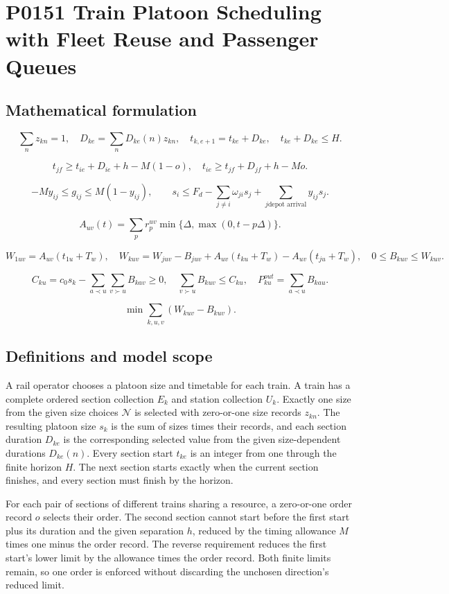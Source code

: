 \documentclass[10pt]{article}
\begin{document}
\section*{P0151 Train Platoon Scheduling with Fleet Reuse and Passenger Queues}
\subsection*{Mathematical formulation}
\[
\sum_nz_{kn}=1,\quad D_{ke}=\sum_nD_{ke}(n)z_{kn},\quad
t_{k,e+1}=t_{ke}+D_{ke},\quad t_{ke}+D_{ke}\le H.
\]

\[
t_{jf}\ge t_{ie}+D_{ie}+h-M(1-o),\quad
t_{ie}\ge t_{jf}+D_{jf}+h-Mo.
\]

\[
-My_{ij}\le g_{ij}\le M(1-y_{ij}),\qquad
s_i\le F_d-\sum_{j\ne i}\omega_{ji}s_j+\sum_{j\text{depot arrival}}y_{ij}s_j.
\]

\[
A_{uv}(t)=\sum_p r^{uv}_p\min\{\Delta,\max(0,t-p\Delta)\}.
\]

\[
W_{1uv}=A_{uv}(t_{1u}+T_w),\quad
W_{kuv}=W_{juv}-B_{juv}+A_{uv}(t_{ku}+T_w)-A_{uv}(t_{ju}+T_w),
\quad0\le B_{kuv}\le W_{kuv}.
\]

\[
C_{ku}=c_0s_k-\sum_{a\prec u}\sum_{v\succ u}B_{kav}\ge0,\quad
\sum_{v\succ u}B_{kuv}\le C_{ku},\quad
P^{out}_{ku}=\sum_{a\prec u}B_{kau}.
\]

\[
\min\sum_{k,u,v}(W_{kuv}-B_{kuv}).
\]

\subsection*{Definitions and model scope}
A rail operator chooses a platoon size and timetable for each train. A train has a complete ordered section collection $E_k$ and station collection $U_k$. Exactly one size from the given size choices $\mathcal N$ is selected with zero-or-one size records $z_{kn}$. The resulting platoon size $s_k$ is the sum of sizes times their records, and each section duration $D_{ke}$ is the corresponding selected value from the given size-dependent durations $D_{ke}(n)$. Every section start $t_{ke}$ is an integer from one through the finite horizon $H$. The next section starts exactly when the current section finishes, and every section must finish by the horizon.

For each pair of sections of different trains sharing a resource, a zero-or-one order record $o$ selects their order. The second section cannot start before the first start plus its duration and the given separation $h$, reduced by the timing allowance $M$ times one minus the order record. The reverse requirement reduces the first start's lower limit by the allowance times the order record. Both finite limits remain, so one order is enforced without discarding the unchosen direction's reduced limit.
\end{document}
